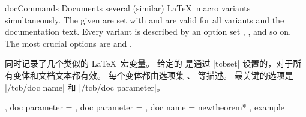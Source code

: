 % 




\begin{docEnvironment}[doclang/environment content=command description,doc new=2020-04-22]
  {docCommands}{}
Documents several (similar) \LaTeX\ macro variants simultaneously.
The given  are set with  and are valid for
all variants and the documentation text.
Every variant is described by an option set , , and so on.
The most crucial options are  and .

同时记录了几个类似的 \LaTeX\ 宏变量。 给定的  是通过 |tcbset| 设置的，对于所有变体和文档文本都有效。 每个变体都由选项集 、 等描述。 最关键的选项是 |/tcb/doc name| 和 |/tcb/doc parameter|。
\begin{dispExample}
\begin{docCommands}[
  doc no index,  %
  doc name      = newtheorem,
  doc parameter = \marg{envname},
]
{
  {  },
  { doc parameter =  },
  { doc parameter =  },
  { doc name      = newtheorem* },
}
example
\end{docCommands}
\end{dispExample}
\end{docEnvironment}




